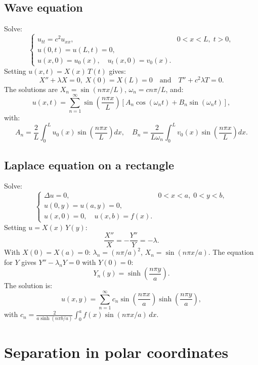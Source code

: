 \subsection{Wave equation}

\begin{example}
Solve:
\[
    \begin{cases}
        u_{tt} = c^2 u_{xx}, & 0 < x < L,\; t > 0,\\
        u(0,t) = u(L,t) = 0,\\
        u(x,0) = u_0(x), \quad u_t(x,0) = v_0(x).
    \end{cases}
\]
Setting $u(x,t) = X(x)\, T(t)$ gives:
\[
    X'' + \lambda X = 0, \; X(0)=X(L)=0 \quad\text{and}\quad
    T'' + c^2\lambda T = 0.
\]
The solutions are $X_n = \sin(n\pi x/L)$, $\omega_n = cn\pi/L$, and:
\[
    u(x,t) = \sum_{n=1}^{\infty} \sin\!\left(\frac{n\pi x}{L}\right)
    \left[A_n \cos(\omega_n t) + B_n \sin(\omega_n t)\right],
\]
with:
\[
    A_n = \frac{2}{L}\int_0^L u_0(x)\sin\!\left(\frac{n\pi x}{L}\right) dx,
    \quad
    B_n = \frac{2}{L\omega_n}\int_0^L v_0(x)\sin\!\left(\frac{n\pi x}{L}\right) dx.
\]
\end{example}

\subsection{Laplace equation on a rectangle}

\begin{example}
Solve:
\[
    \begin{cases}
        \Delta u = 0, & 0 < x < a,\; 0 < y < b,\\
        u(0,y) = u(a,y) = 0,\\
        u(x,0) = 0, \quad u(x,b) = f(x).
    \end{cases}
\]
Setting $u = X(x)\, Y(y)$:
\[
    \frac{X''}{X} = -\frac{Y''}{Y} = -\lambda.
\]
With $X(0) = X(a) = 0$: $\lambda_n = (n\pi/a)^2$,
$X_n = \sin(n\pi x/a)$. The equation for $Y$ gives
$Y'' - \lambda_n Y = 0$ with $Y(0) = 0$:
\[
    Y_n(y) = \sinh\!\left(\frac{n\pi y}{a}\right).
\]
The solution is:
\[
    u(x,y) = \sum_{n=1}^{\infty} c_n \sin\!\left(\frac{n\pi x}{a}\right)
    \sinh\!\left(\frac{n\pi y}{a}\right),
\]
with $c_n = \frac{2}{a\sinh(n\pi b/a)}\int_0^a f(x)\sin(n\pi x/a)\, dx$.
\end{example}

\section{Separation in polar coordinates}

